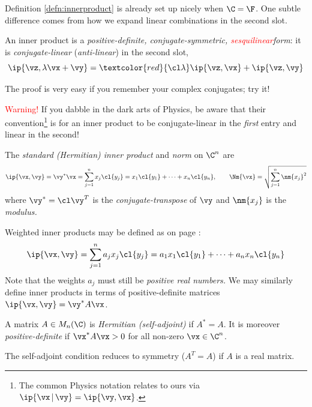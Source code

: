 
Definition \ref{defn:innerproduct} is already set up nicely when $\C=\F$. One subtle difference comes from how we expand linear combinations in the second slot.

\begin{lemm}{}{}
An inner product is a \emph{positive-definite, conjugate-symmetric, \textcolor{red}{sesquilinear}\footnotemark form}: it is \emph{conjugate-linear} (\emph{anti-linear}) in the second slot,
\[\ip{\vz,\lambda\vx+\vy}=\textcolor{red}{\cl\lambda}\ip{\vz,\vx}+\ip{\vz,\vy}\]
\end{lemm}

The proof is very easy if you remember your complex conjugates; try it!\smallbreak


\textcolor{red}{Warning!} If you dabble in the dark arts of Physics, be aware that their convention\footnote{The common Physics notation relates to ours via $\ip{\vx\,|\,\vy}=\ip{\vy,\vx}$.} is for an inner product to be conjugate-linear in the \emph{first} entry and linear in the second!

\begin{defn}{}{}
The \emph{standard (Hermitian) inner product} and \emph{norm} on $\C^n$ are
\[\ip{\vx,\vy}=\vy^*\vx=\sum_{j=1}^nx_j\cl{y_j}=x_1\cl{y_1}+\cdots+x_n\cl{y_n},\qquad \Nm{\vx}=\sqrt{\sum_{j=1}^n\nm{x_j}^2}\]
where $\vy^*=\cl\vy^T$ is the \emph{conjugate-transpose} of $\vy$ and $\nm{x_j}$ is the \emph{modulus.}
\end{defn}

Weighted inner products may be defined as on page \pageref{ex:ipsweight}:
\[\ip{\vx,\vy}=\sum_{j=1}^na_jx_j\cl{y_j}=a_1x_1\cl{y_1}+\cdots+a_nx_n\cl{y_n}\]
Note that the weights $a_j$ must still be \emph{positive real numbers.} We may similarly define inner products in terms of positive-definite matrices $\ip{\vx,\vy}=\vy^*A\vx$.

\begin{defn}{}{}
A matrix $A\in M_n(\C)$ is \emph{Hermitian (self-adjoint)} if $A^*=A$. It is moreover \emph{positive-definite} if $\vx^*A\vx>0$ for all non-zero $\vx\in\C^n$.
\end{defn}

The self-adjoint condition reduces to symmetry ($A^T=A$) if $A$ is a real matrix.

